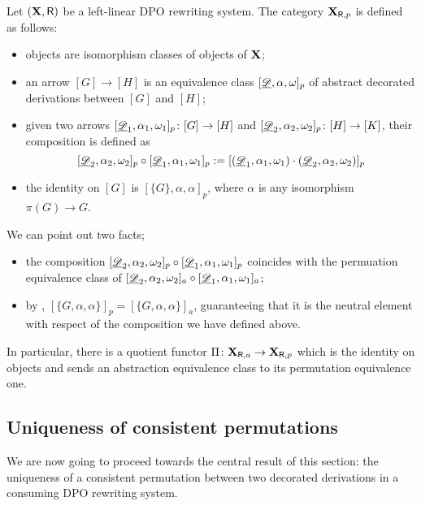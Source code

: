 \begin{definition}
Let $(\textbf {\textup{X}}, \mathsf{R})$ be a left-linear DPO rewriting system. The category $\textbf {\textup{X}}_{\mathsf{R}, p}$ is defined as follows: 
	\begin{itemize}
	\item objects are isomorphism classes of objects of $\textbf {\textup{X}}$;
	\item an arrow $[G]\to [H]$ is an equivalence class $[\underline{\mathscr{D}}, \alpha, \omega]_p$ of abstract decorated derivations between $[G]$ and $[H]$;
	\item given two arrows $[\underline{\mathscr{D}}_1, \alpha_1, \omega_1] _p\colon [G]\to [H]$ and $[\underline{\mathscr{D}}_2, \alpha_2, \omega_2] _p\colon [H]\to [K]$, their composition is defined as
	\[[\underline{\mathscr{D}}_2, \alpha_2, \omega_2]_p \circ [\underline{\mathscr{D}}_1, \alpha_1, \omega_1]_p:=[(\underline{\mathscr{D}}_1, \alpha_1, \omega_1) \cdot (\underline{\mathscr{D}}_2, \alpha_2, \omega_2)]_p\] 
	\item the identity on $[G]$ is $[\{G\}, \alpha, \alpha]_p$, where $\alpha$ is any isomorphism $\pi(G)\to G$.	\end{itemize}
\end{definition}
\begin{remark} We can point out two facts;
	\begin{itemize}
		\item the composition 	$[\underline{\mathscr{D}}_2, \alpha_2, \omega_2]_p \circ [\underline{\mathscr{D}}_1, \alpha_1, \omega_1]_p$ coincides with the permuation equivalence class of $	[\underline{\mathscr{D}}_2, \alpha_2, \omega_2]_a \circ [\underline{\mathscr{D}}_1, \alpha_1, \omega_1]_a$;
		\item by , $[\{G, \alpha, \alpha\}]_p=[\{G, \alpha, \alpha\}]_a$, guaranteeing that it is the neutral element with respect of the composition we have defined above.
	\end{itemize}
	
	In particular, there is a quotient functor $\Pi\colon \textbf {\textup{X}}_{\mathsf{R}, a}\to \textbf {\textup{X}}_{\mathsf{R}, p}$ which is the identity on objects and sends an abstraction equivalence class to its permutation equivalence one.
\end{remark}

\subsection{Uniqueness of consistent permutations}

We are now going to proceed towards the central result of this section: the uniqueness of a consistent permutation between two decorated derivations in a consuming DPO rewriting system.
 
